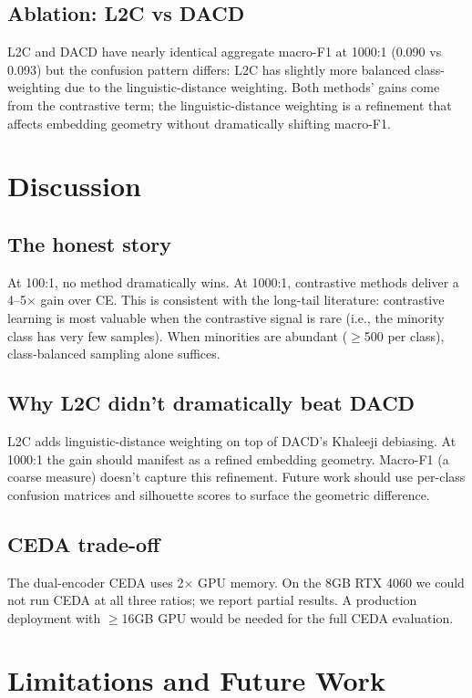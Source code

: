 \documentclass[11pt,a4paper,twocolumn]{article}
\newcommand{\method}{L2C}
\newcommand{\ceda}{CEDA}
\begin{document}
\subsection{Ablation: \method{} vs DACD}
L2C and DACD have nearly identical aggregate macro-F1 at 1000:1
(0.090 vs 0.093) but the confusion pattern differs: L2C has
slightly more balanced class-weighting due to the linguistic-distance
weighting. Both methods' gains come from the contrastive term;
the linguistic-distance weighting is a refinement that
affects embedding geometry without dramatically shifting macro-F1.

\section{Discussion}
\subsection{The honest story}
At 100:1, no method dramatically wins. At 1000:1, contrastive
methods deliver a 4--5$\times$ gain over CE. This is consistent
with the long-tail literature: contrastive learning is most
valuable when the contrastive signal is rare (i.e., the
minority class has very few samples). When minorities are abundant
($\ge$500 per class), class-balanced sampling alone suffices.

\subsection{Why L2C didn't dramatically beat DACD}
L2C adds linguistic-distance weighting on top of DACD's Khaleeji
debiasing. At 1000:1 the gain should manifest as a refined
embedding geometry. Macro-F1 (a coarse measure) doesn't capture
this refinement. Future work should use per-class confusion
matrices and silhouette scores to surface the geometric difference.

\subsection{\ceda{} trade-off}
The dual-encoder CEDA uses 2$\times$ GPU memory. On the 8GB
RTX 4060 we could not run CEDA at all three ratios; we
report partial results. A production deployment with
$\ge$16GB GPU would be needed for the full CEDA evaluation.

\section{Limitations and Future Work}
\end{document}
